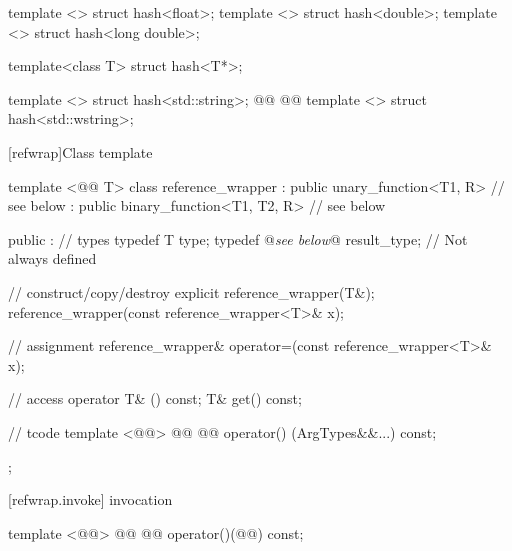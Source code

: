 \documentclass[american,twoside]{book}
\begin{document}
\begin{codeblock}
{  template <> struct hash<float>;
  template <> struct hash<double>;
  template <> struct hash<long double>;

  template<class T> struct hash<T*>;

  template <> struct hash<std::string>;
  @@
  @@
  template <> struct hash<std::wstring>;
}
\end{codeblock}

\setcounter{subsection}{4}
[refwrap]{\marktr{}Class template }

\begin{codeblock}
template <@@ T> class reference_wrapper 
  : public unary_function<T1, R>          // see below
  : public binary_function<T1, T2, R>     // see below
{ 
public :
  // types
  typedef T type;
  typedef @\textit{see below}@ result_type; // Not always defined

  // construct/copy/destroy
  explicit reference_wrapper(T&);
  reference_wrapper(const reference_wrapper<T>& x);

  // assignment
  reference_wrapper& operator=(const reference_wrapper<T>& x);

  // access
  operator T& () const;
  T& get() const;

  // tcode{}
  template <@@>
    @@
    @@
  operator() (ArgTypes&&...) const;
}; 
\end{codeblock}

\setcounter{subsubsection}{3}
[refwrap.invoke]{ invocation}
%
%
\begin{itemdecl}
template <@@>
  @@
  @@
    operator()(@@) const;
\end{itemdecl}
\end{document}
